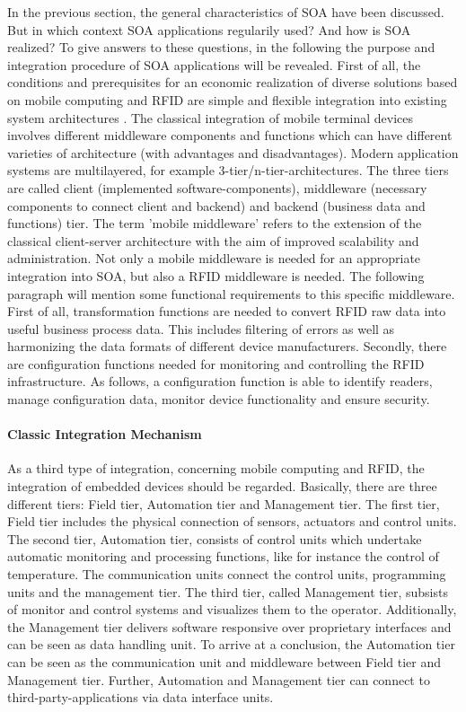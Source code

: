 In the previous section, the general characteristics of SOA have been discussed. But in which context SOA applications regularily used? And how is SOA realized? To give answers to these questions, in the following the purpose and integration procedure of SOA applications will be revealed. 
First of all, the conditions and prerequisites for an economic realization of diverse solutions based on mobile computing and RFID are simple and flexible integration into existing system architectures \cite[p.133 ff.]{mobile}. The classical integration of mobile terminal devices involves different middleware components and functions which can have different varieties of architecture (with advantages and disadvantages). Modern application systems are multilayered, for example 3-tier/n-tier-architectures. The three tiers are called client (implemented software-components), middleware (necessary components to connect client and backend) and backend (business data and functions) tier. The term 'mobile middleware' refers to the extension of the classical client-server architecture with the aim of improved scalability and administration.
Not only a mobile middleware is needed for an appropriate integration into SOA, but also a RFID middleware is needed. The following paragraph will mention some functional requirements to this specific middleware. First of all, transformation functions are needed to convert RFID raw data into useful business process data. This includes filtering of errors as well as harmonizing the data formats of different device manufacturers. Secondly, there are configuration functions needed for monitoring and controlling the RFID infrastructure. As follows, a configuration function is able to identify readers, manage configuration data, monitor device functionality and ensure security.  

\paragraph{Classic Integration Mechanism}

As a third type of integration, concerning mobile computing and RFID, the integration of embedded devices should be regarded. Basically, there are three different tiers: Field tier, Automation tier and Management tier. The first tier, Field tier includes the physical connection of sensors, actuators and control units. The second tier, Automation tier, consists of control units which undertake automatic monitoring and processing functions, like for instance the control of temperature. The communication units connect the control units, programming units and the management tier. The third tier, called Management tier, subsists of monitor and control systems and visualizes them to the operator. Additionally, the Management tier delivers software responsive over proprietary interfaces and can be seen as data handling unit. 
To arrive at a conclusion, the Automation tier can be seen as the communication unit and middleware between Field tier and Management tier. Further, Automation and Management tier can connect to third-party-applications via data interface units.
 
